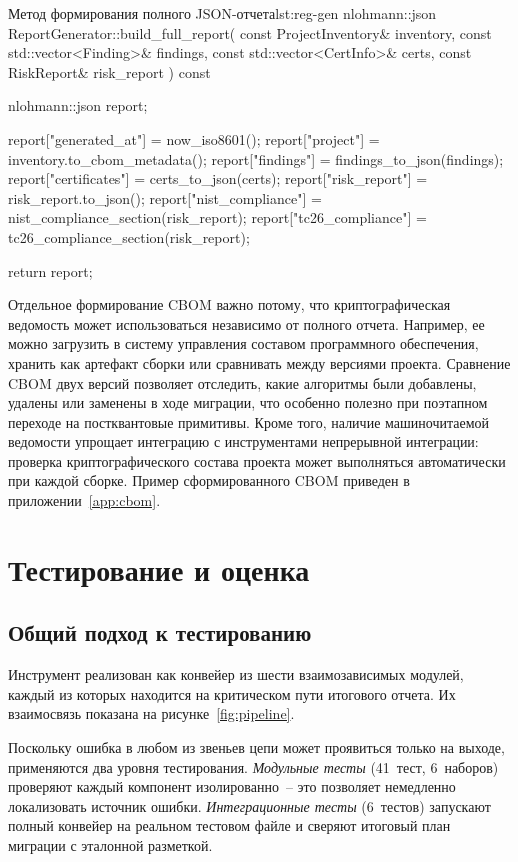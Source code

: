 \documentclass{itmo-vkr}
\begin{document}
\begin{itmolistingfloat}[C++]{Метод формирования полного JSON-отчета}{lst:reg-gen}
nlohmann::json ReportGenerator::build_full_report(
const ProjectInventory& inventory,
const std::vector<Finding>& findings,
const std::vector<CertInfo>& certs,
const RiskReport& risk_report
) const {
	nlohmann::json report;
	
	report["generated_at"] = now_iso8601();
	report["project"] = inventory.to_cbom_metadata();
	report["findings"] = findings_to_json(findings);
	report["certificates"] = certs_to_json(certs);
	report["risk_report"] = risk_report.to_json();
	report["nist_compliance"] =
	nist_compliance_section(risk_report);
	report["tc26_compliance"] =
	tc26_compliance_section(risk_report);
	
	return report;
}
\end{itmolistingfloat}

Отдельное формирование CBOM важно потому, что криптографическая ведомость может использоваться независимо от полного отчета. Например, ее можно загрузить в систему управления составом программного обеспечения, хранить как артефакт сборки или сравнивать между версиями проекта. Сравнение CBOM двух версий позволяет отследить, какие алгоритмы были добавлены, удалены или заменены в ходе миграции, что особенно полезно при поэтапном переходе на постквантовые примитивы. Кроме того, наличие машиночитаемой ведомости упрощает интеграцию с инструментами непрерывной интеграции: проверка криптографического состава проекта может выполняться автоматически при каждой сборке. Пример сформированного CBOM приведен в приложении~\ref{app:cbom}.
	
	
\section{Тестирование и оценка}

\subsection{Общий подход к тестированию}

Инструмент реализован как конвейер из шести взаимозависимых модулей,
каждый из которых находится на критическом пути итогового отчета.
Их взаимосвязь показана на рисунке~\ref{fig:pipeline}.

Поскольку ошибка в любом из звеньев цепи может проявиться только на
выходе, применяются два уровня тестирования.
\textit{Модульные тесты} (41~тест, 6~наборов) проверяют каждый
компонент изолированно~-- это позволяет немедленно локализовать
источник ошибки.
\textit{Интеграционные тесты} (6~тестов) запускают полный конвейер
на реальном тестовом файле и сверяют итоговый план миграции с
эталонной разметкой.
\end{document}
